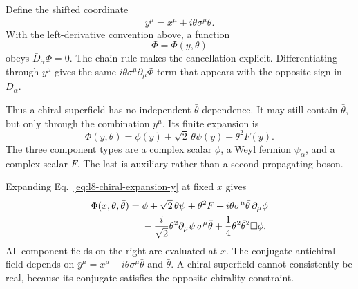 Define the shifted coordinate
\begin{equation}
y^\mu=x^\mu+i\theta\sigma^\mu\bar\theta.
\label{eq:l8-chiral-coordinate}
\end{equation}
With the left-derivative convention above, a function
\begin{equation}
\Phi=\Phi(y,\theta)
\label{eq:l8-chiral-solution}
\end{equation}
obeys \(\bar D_{\dot\alpha}\Phi=0\). The chain rule makes the cancellation explicit. Differentiating through \(y^\mu\) gives the same \(i\theta\sigma^\mu\partial_\mu\Phi\) term that appears with the opposite sign in \(\bar D_{\dot\alpha}\).

Thus a chiral superfield has no independent \(\bar\theta\)-dependence. It may still contain \(\bar\theta\), but only through the combination \(y^\mu\). Its finite expansion is
\begin{equation}
\Phi(y,\theta)
=\phi(y)+\sqrt2\,\theta\psi(y)+\theta^2F(y).
\label{eq:l8-chiral-expansion-y}
\end{equation}
The three component types are a complex scalar \(\phi\), a Weyl fermion \(\psi_\alpha\), and a complex scalar \(F\). The last is auxiliary rather than a second propagating boson.

\begin{classroomqa}
\end{classroomqa}

Expanding Eq.~\eqref{eq:l8-chiral-expansion-y} at fixed \(x\) gives
\begin{align}
\Phi(x,\theta,\bar\theta)
={}&\phi
+\sqrt2\,\theta\psi
+\theta^2F
+i\theta\sigma^\mu\bar\theta\,\partial_\mu\phi
\notag\\
&-\frac{i}{\sqrt2}\theta^2
\partial_\mu\psi\,\sigma^\mu\bar\theta
+\frac14\theta^2\bar\theta^2\Box\phi.
\label{eq:l8-chiral-expansion-x}
\end{align}
All component fields on the right are evaluated at \(x\). The conjugate antichiral field depends on
\(\bar y^\mu=x^\mu-i\theta\sigma^\mu\bar\theta\) and \(\bar\theta\). A chiral superfield cannot consistently be real, because its conjugate satisfies the opposite chirality constraint.

